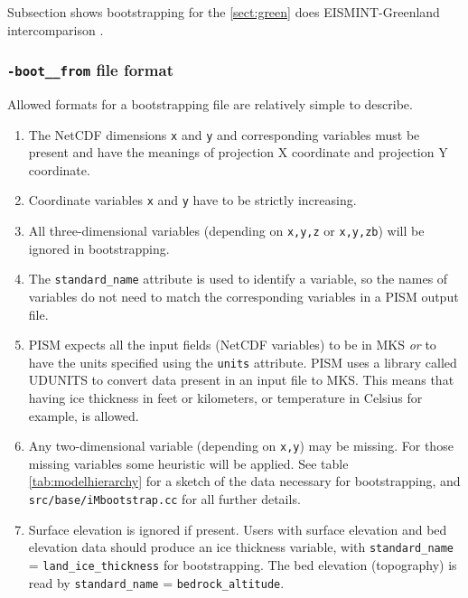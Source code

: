 \documentclass[11pt,final]{amsart}
\newcommand{\und}{\_\!\_}
\begin{document}
Subsection shows bootstrapping for the \ref{sect:green} does EISMINT-Greenland intercomparison \cite{RitzEISMINT,HuybrechtsEISMINT}.

\subsubsection*{\texttt{-boot\und from} file format}
\label{sec:bootstrapping-format}  Allowed formats for a bootstrapping file are relatively simple to describe. 
\begin{enumerate}
\item The NetCDF dimensions \verb|x| and \verb|y| and corresponding variables must be present and have the meanings of projection X coordinate and projection Y coordinate.
\item Coordinate variables \verb|x| and \verb|y| have to be strictly increasing.
\item All three-dimensional variables (depending on \verb|x,y,z| or \verb|x,y,zb|) will be ignored in bootstrapping.
\item The \verb|standard_name| attribute is used to identify a variable, so the names of variables do not need to match the corresponding variables in a PISM output file.
\item PISM expects all the input fields (NetCDF variables) to be in MKS \emph{or} to have the units specified using the \verb|units| attribute.  PISM uses a library called UDUNITS to convert data present in an input file to MKS.   This means that having ice thickness in feet or kilometers, or temperature in Celsius for example, is allowed.
\item Any two-dimensional variable (depending on \verb|x,y|) may be missing.  For those missing variables some heuristic will be applied.  See table \ref{tab:modelhierarchy} for a sketch of the data necessary for bootstrapping, and \verb|src/base/iMbootstrap.cc| for all further details.
\item Surface elevation is ignored if present.  Users with surface elevation and bed elevation data should produce an ice thickness variable, with \verb|standard_name| = \verb|land_ice_thickness| for bootstrapping.  The bed elevation (topography) is read by \verb|standard_name| = \verb|bedrock_altitude|.
\end{enumerate}
\end{document}
